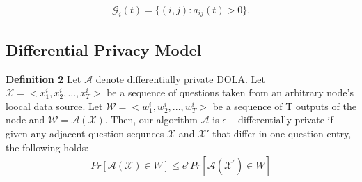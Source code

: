 \documentclass{article}
\begin{document}
\begin{eqnarray*}
	\mathcal{G}_i(t) = \{(i,j):a_{ij}(t)>0\}.
\end{eqnarray*}

\subsection{Differential Privacy Model}
\textbf{Definition 2}
Let $\mathcal{A}$ denote differentially private DOLA.
Let $\mathcal{X}=<x_1^i, x_2^i,..., x_T^i>$ be a sequence of questions taken from an arbitrary node's loocal data source. Let $\mathcal{W}=<w_1^i, w_2^i, ..., w_T^i>$ be a sequence of T outputs of the node and $\mathcal{W} = \mathcal{A}(\mathcal{X})$. Then, our algorithm $\mathcal{A}$ is $\epsilon-$differentially private if given any adjacent question sequnces $\mathcal{X}$ and $\mathcal{X'}$ that differ in one question entry, the following holds:
\begin{eqnarray*}
	Pr[\mathcal{A} (\mathcal{X}) \in W] \leq e^{\epsilon}Pr[\mathcal{A} ( \mathcal{X}^{'} ) \in W ]
\end{eqnarray*}

	



		
	
	
	
	
\end{document}
